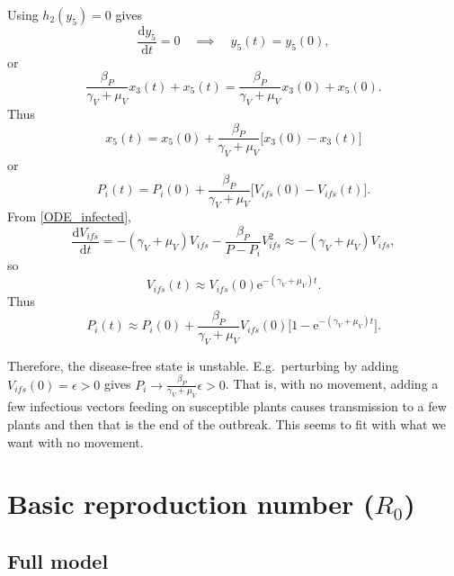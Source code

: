\documentclass{article}
\newcommand{\md}{\mathrm{d}}
\newcommand{\me}{\mathrm{e}}
\begin{document}
Using $h_2(y_5) = 0$ gives
\begin{equation}
  \frac{\md y_5}{\md t} = 0
  \quad\implies\quad
  y_5(t) = y_5(0),
\end{equation}
or
\begin{equation}
  \frac{\beta_P}{\gamma_V + \mu_V} x_3(t) + x_5(t)
  = \frac{\beta_P}{\gamma_V + \mu_V} x_3(0) + x_5(0).
\end{equation}
Thus
\begin{equation}
  x_5(t)
  = x_5(0) + \frac{\beta_P}{\gamma_V + \mu_V} \big[x_3(0) - x_3(t)\big]
\end{equation}
or
\begin{equation}
  P_i(t) =
  P_i(0) +
  \frac{\beta_P}{\gamma_V + \mu_V} \big[V_{ifs}(0) - V_{ifs}(t)\big].
\end{equation}
From \eqref{ODE_infected},
\begin{equation}
  \frac{\md V_{ifs}}{\md t}
  = - (\gamma_V + \mu_V) V_{ifs} - \frac{\beta_P}{P - P_i} V_{ifs}^2  
  \approx - (\gamma_V + \mu_V) V_{ifs},
\end{equation}
so
\begin{equation}
  V_{ifs}(t) \approx V_{ifs}(0) \me^{- (\gamma_V + \mu_V) t}.
\end{equation}
Thus
\begin{equation}
  P_i(t) \approx
  P_i(0) +
  \frac{\beta_P}{\gamma_V + \mu_V}
  V_{ifs}(0) \big[1 - \me^{- (\gamma_V + \mu_V) t}\big].
\end{equation}

Therefore, the disease-free state is unstable.  E.g.~perturbing by
adding $V_{ifs}(0) = \epsilon > 0$ gives
$P_i \to \frac{\beta_P}{\gamma_V + \mu_V} \epsilon > 0$.  That is,
with no movement, adding a few infectious vectors feeding on
susceptible plants causes transmission to a few plants and then that
is the end of the outbreak.  This seems to fit with what we want with
no movement.

\section{Basic reproduction number ($R_0$)}

\subsection{Full model}
\end{document}
